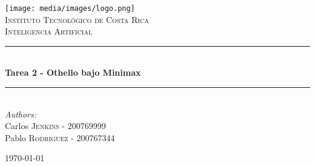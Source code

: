 \newcommand{\HRule}{\rule{\linewidth}{0.5mm}}

\begin{titlepage}
\begin{center}

\texttt{[image: media/images/logo.png]}\\[1cm]
\textsc{\LARGE Instituto Tecnológico de Costa Rica}\\[1.5cm]
\textsc{\Large Inteligencia Artificial}\\[0.5cm]


\HRule \\[0.4cm]
{ \huge \bfseries Tarea 2 - Othello bajo Minimax}\\[0.4cm]
\HRule \\[1.5cm]


\emph{Authors:}\\
Carlos \textsc{Jenkins} - 200769999\\
Pablo \textsc{Rodriguez} - 200767344\\

\vfill

{\large \today}

\end{center}
\end{titlepage}


